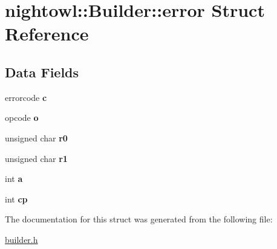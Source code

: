 \hypertarget{structnightowl_1_1Builder_1_1error}{\section{nightowl\-:\-:Builder\-:\-:error Struct Reference}
\label{structnightowl_1_1Builder_1_1error}
}
\subsection*{Data Fields}
\begin{DoxyCompactItemize}
\item 
\hypertarget{structnightowl_1_1Builder_1_1error_acbbe6390bf8ffb328866accd5ea305b9}{errorcode {\bfseries c}}\label{structnightowl_1_1Builder_1_1error_acbbe6390bf8ffb328866accd5ea305b9}

\item 
\hypertarget{structnightowl_1_1Builder_1_1error_a4b7d983e12ecad78728082e538dd1210}{opcode {\bfseries o}}\label{structnightowl_1_1Builder_1_1error_a4b7d983e12ecad78728082e538dd1210}

\item 
\hypertarget{structnightowl_1_1Builder_1_1error_aa81ede499a60b9a0ea4bf4bef5ad1797}{unsigned char {\bfseries r0}}\label{structnightowl_1_1Builder_1_1error_aa81ede499a60b9a0ea4bf4bef5ad1797}

\item 
\hypertarget{structnightowl_1_1Builder_1_1error_afee9f5b43b30b2dea5e29c547714e96b}{unsigned char {\bfseries r1}}\label{structnightowl_1_1Builder_1_1error_afee9f5b43b30b2dea5e29c547714e96b}

\item 
\hypertarget{structnightowl_1_1Builder_1_1error_a9180d6208765ebc69000f0cbfb795526}{int {\bfseries a}}\label{structnightowl_1_1Builder_1_1error_a9180d6208765ebc69000f0cbfb795526}

\item 
\hypertarget{structnightowl_1_1Builder_1_1error_abb25bb47649f0c87f06aca4ea41d9c6a}{int {\bfseries cp}}\label{structnightowl_1_1Builder_1_1error_abb25bb47649f0c87f06aca4ea41d9c6a}

\end{DoxyCompactItemize}


The documentation for this struct was generated from the following file\-:\begin{DoxyCompactItemize}
\item 
\hyperlink{builder_8h}{builder.\-h}\end{DoxyCompactItemize}
